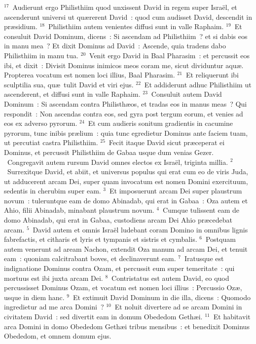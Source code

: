 ${}^{17}$~Audierunt ergo Philisthiim quod unxissent David in regem super Isra\"el, et ascenderunt universi ut qu\ae rerent David~: quod cum audisset David, descendit in pr\ae sidium.
${}^{18}$~Philisthiim autem venientes diffusi sunt in valle Raphaim.
${}^{19}$~Et consuluit David Dominum, dicens~: Si ascendam ad Philisthiim~? et si dabis eos in manu mea~? Et dixit Dominus ad David~: Ascende, quia tradens dabo Philisthiim in manu tua.
${}^{20}$~Venit ergo David in Baal Pharasim~: et percussit eos ibi, et dixit~: Divisit Dominus inimicos meos coram me, sicut dividuntur aqu\ae . Propterea vocatum est nomen loci illius, Baal Pharasim.
${}^{21}$~Et reliquerunt ibi sculptilia sua, qu\ae\ tulit David et viri ejus.
${}^{22}$~Et addiderunt adhuc Philisthiim ut ascenderent, et diffusi sunt in valle Raphaim.
${}^{23}$~Consuluit autem David Dominum~: Si ascendam contra Philisth\ae os, et tradas eos in manus meas~? Qui respondit~: Non ascendas contra eos, sed gyra post tergum eorum, et venies ad eos ex adverso pyrorum.
${}^{24}$~Et cum audieris sonitum gradientis in cacumine pyrorum, tunc inibis pr\ae lium~: quia tunc egredietur Dominus ante faciem tuam, ut percutiat castra Philisthiim.
${}^{25}$~Fecit itaque David sicut pr\ae ceperat ei Dominus, et percussit Philisthiim de Gabaa usque dum venias Gezer.
~Congregavit autem rursum David omnes electos ex Isra\"el, triginta millia.
${}^{2}$~Surrexitque David, et abiit, et universus populus qui erat cum eo de viris Juda, ut adducerent arcam Dei, super quam invocatum est nomen Domini exercituum, sedentis in cherubim super eam.
${}^{3}$~Et imposuerunt arcam Dei super plaustrum novum~: tuleruntque eam de domo Abinadab, qui erat in Gabaa~: Oza autem et Ahio, filii Abinadab, minabant plaustrum novum.
${}^{4}$~Cumque tulissent eam de domo Abinadab, qui erat in Gabaa, custodiens arcam Dei Ahio pr\ae cedebat arcam.
${}^{5}$~David autem et omnis Isra\"el ludebant coram Domino in omnibus lignis fabrefactis, et citharis et lyris et tympanis et sistris et cymbalis.
${}^{6}$~Postquam autem venerunt ad aream Nachon, extendit Oza manum ad arcam Dei, et tenuit eam~: quoniam calcitrabant boves, et declinaverunt eam.
${}^{7}$~Iratusque est indignatione Dominus contra Ozam, et percussit eum super temeritate~: qui mortuus est ibi juxta arcam Dei.
${}^{8}$~Contristatus est autem David, eo quod percussisset Dominus Ozam, et vocatum est nomen loci illius~: Percussio Oz\ae , usque in diem hanc.
${}^{9}$~Et extimuit David Dominum in die illa, dicens~: Quomodo ingredietur ad me arca Domini~?
${}^{10}$~Et noluit divertere ad se arcam Domini in civitatem David~: sed divertit eam in domum Obededom Geth\ae i.
${}^{11}$~Et habitavit arca Domini in domo Obededom Geth\ae i tribus mensibus~: et benedixit Dominus Obededom, et omnem domum ejus.


